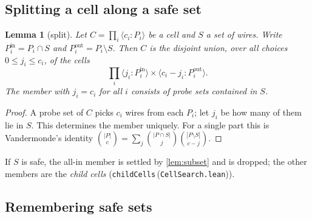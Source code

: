 \documentclass[11pt,a4paper]{article}
\newtheorem{lemma}[theorem]{Lemma}
\theoremstyle{definition}
\theoremstyle{remark}
\newcommand{\code}[1]{\texttt{\small #1}}
\newcommand{\lean}[2]{\code{#1}\,(\code{#2})}
\newcommand{\cellof}[2]{\langle #1 \mathbin{:} #2\rangle}
\begin{document}
\subsection{Splitting a cell along a safe set}

\begin{lemma}[split]\label{lem:split}
Let $C = \prod_i \cellof{c_i}{P_i}$ be a cell and $S$ a set of wires.  Write
$P_i^{\mathrm{in}} = P_i\cap S$ and $P_i^{\mathrm{out}} = P_i\setminus S$.  Then $C$ is the
disjoint union, over all choices $0\le j_i\le c_i$, of the cells
\[ \textstyle\prod_i \cellof{j_i}{P_i^{\mathrm{in}}}\times\cellof{c_i-j_i}{P_i^{\mathrm{out}}}. \]
The member with $j_i = c_i$ for all $i$ consists of probe sets contained in $S$.
\end{lemma}
\begin{proof}
A probe set of $C$ picks $c_i$ wires from each $P_i$; let $j_i$ be how many of them lie
in $S$.  This determines the member uniquely.  For a single part this is Vandermonde's
identity $\binom{|P|}{c} = \sum_j \binom{|P\cap S|}{j}\binom{|P\setminus S|}{c-j}$.
\end{proof}

If $S$ is safe, the all-in member is settled by \cref{lem:subset} and is dropped; the other
members are the \emph{child cells} (\lean{childCells}{CellSearch.lean}).

\subsection{Remembering safe sets}
\end{document}
